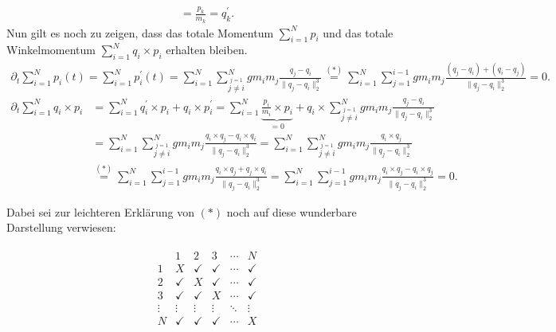 \begin{solution}
\begin{align*}
    = \frac{p_k}{m_k} = q_k^{\prime}.
  \end{align*}
  Nun gilt es noch zu zeigen, dass das totale Momentum $\sum_{i=1}^N p_i$
  und das totale Winkelmomentum $\sum_{i=1}^N q_i \times p_i$ erhalten bleiben.
  \begin{align*}
    \partial_t \sum_{i=1}^N p_i(t) = \sum_{i=1}^N p_i^{\prime}(t)
    = \sum_{i=1}^N \sum_{\stackrel{j = 1}{j \neq i}}^N gm_im_j \frac{q_j - q_i}{\|q_j - q_i\|_2^3}
    \stackrel{(*)}{=} \sum_{i=1}^N \sum_{j = 1}^{i-1} gm_im_j \frac{(q_j - q_i) + (q_i - q_j)}{\|q_j - q_i\|_2^3} = 0.
  \end{align*}
  \begin{align*}
    \partial_t \sum_{i=1}^N q_i \times p_i &= \sum_{i = 1}^Nq_i^{\prime} \times p_i + q_i \times p_i^{\prime}
    = \sum_{i = 1}^N\underbrace{\frac{p_i}{m_i} \times p_i}_{= 0} + q_i \times \sum_{\stackrel{j = 1}{j \neq i}}^N gm_im_j \frac{q_j - q_i}{\|q_j - q_i\|_2^3} \\
    &= \sum_{i = 1}^N \sum_{\stackrel{j = 1}{j \neq i}}^N gm_im_j \frac{q_i \times q_j - q_i \times q_i}{\|q_j - q_i\|_2^3}
    = \sum_{i = 1}^N \sum_{\stackrel{j = 1}{j \neq i}}^N gm_im_j \frac{q_i \times q_j}{\|q_j - q_i\|_2^3} \\
    &\stackrel{(*)}{=} \sum_{i = 1}^N \sum_{j = 1}^{i-1} gm_im_j \frac{q_i \times q_j + q_j \times q_i}{\|q_j - q_i\|_2^3}
    = \sum_{i = 1}^N \sum_{j = 1}^{i-1} gm_im_j \frac{q_i \times q_j - q_i \times q_j}{\|q_j - q_i\|_2^3} = 0.
  \end{align*}

  Dabei sei zur leichteren Erklärung von $(*)$ noch auf diese wunderbare Darstellung
  verwiesen:

  \begin{align*}
    \begin{array}{c|ccccc}
      & 1 & 2 & 3 & \cdots & N \\
      \hline
      1 & X & \checkmark & \checkmark & \cdots & \checkmark \\
      2 & \checkmark & X & \checkmark & \cdots & \checkmark \\
      3 & \checkmark & \checkmark & X & \cdots & \checkmark \\
      \vdots & \vdots & \vdots & \vdots & \ddots & \vdots \\
      N & \checkmark & \checkmark &  \checkmark & \cdots & X
    \end{array}
  \end{align*}
\end{solution}
